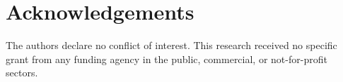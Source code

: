 \documentclass[10pt,a4paper,twocolumn]{article}
\begin{document}
\section*{Acknowledgements}
The authors declare no conflict of interest. This research received no specific
grant from any funding agency in the public, commercial, or not-for-profit
sectors. %

{\footnotesize


}
\end{document}

